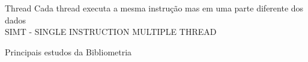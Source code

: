 \begin{frame}[t]{Thread}
    \large
    Cada thread executa a mesma instrução mas em uma parte diferente dos dados\\
    SIMT - SINGLE INSTRUCTION MULTIPLE THREAD
\end{frame}
\begin{frame}{Principais estudos da Bibliometria}


\end{frame}
